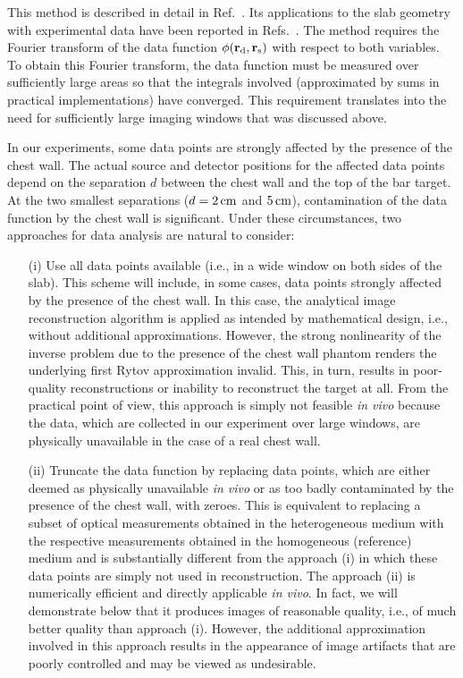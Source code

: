 This method is described in detail in Ref.~\cite{markel_04_4}. Its applications to the slab geometry with experimental data have been reported in Refs.~\cite{wang_05_1,konecky_08_1}. The method requires the Fourier transform of the data function $\phi({\bf r}_{\rm d}, {\bf
  r}_{\rm s})$ with respect to both variables. To obtain this Fourier transform, the data function must be measured over sufficiently large areas so that the integrals involved (approximated by sums in practical implementations) have converged. This requirement translates
into the need for sufficiently large imaging windows that was discussed above.

In our experiments, some data points are strongly affected by the  presence of the chest wall. The actual source and detector positions for the  affected data points depend on the separation $d$ between the chest wall and  the top of the bar target. At the two smallest separations ($d=2\,{\rm cm}$  and $5\,{\rm cm}$), contamination of the data function by the chest wall is 
significant. Under these circumstances, two approaches for data analysis are natural to consider:

\begin{itemize}
  
\item[(i)] Use all data points available (i.e., in a wide window on
  both sides of the slab). This scheme will include, in some cases,
  data points strongly affected by the presence of the chest wall. In
  this case, the analytical image reconstruction algorithm is applied
  as intended by mathematical design, i.e., without additional
  approximations. However, the strong nonlinearity of the inverse
  problem due to the presence of the chest wall phantom renders the
  underlying first Rytov approximation invalid. This, in turn, results
  in poor-quality reconstructions or inability to reconstruct the
  target at all. From the practical point of view, this approach is
  simply not feasible {\em in vivo} because the data, which are
  collected in our experiment over large windows, are physically
  unavailable in the case of a real chest wall.

\item[(ii)] Truncate the data function by replacing data points, which
  are either deemed as physically unavailable {\em in vivo} or as too
  badly contaminated by the presence of the chest wall, with zeroes.
  This is equivalent to replacing a subset of optical measurements
  obtained in the heterogeneous medium with the respective measurements
  obtained in the homogeneous (reference) medium and is substantially
  different from the approach (i) in which these data points are
  simply not used in reconstruction. The approach (ii) is numerically
  efficient and directly applicable {\em in vivo}. In fact, we will
  demonstrate below that it produces images of reasonable quality,
  i.e., of much better quality than approach (i). However, the
  additional approximation involved in this approach results in the
  appearance of image artifacts that are poorly controlled and may be
  viewed as undesirable.

\end{itemize}


